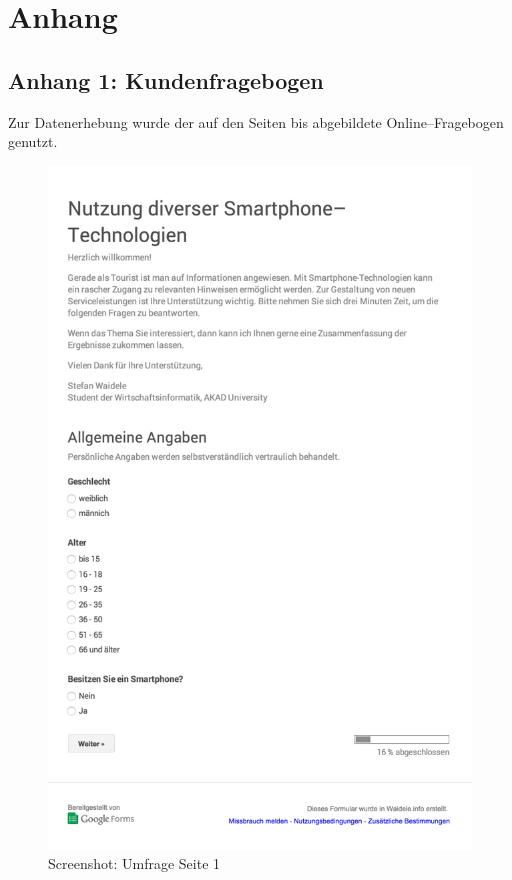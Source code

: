 
\appendix
\section*{Anhang}

\subsection*{Anhang 1: Kundenfragebogen}
\label{sec:kundenbefragung}

Zur Datenerhebung wurde der auf den Seiten \pageref{pic:us1} bis \pageref{pic:us6} abgebildete Online–Fragebogen genutzt. 

\begin{figure}[H]
\begin{center}
\includegraphics[width=.6\textwidth]{Umfrage-S1.png}
\caption{Screenshot: Umfrage Seite 1}
\label{pic:us1}
\end{center}
\end{figure}

